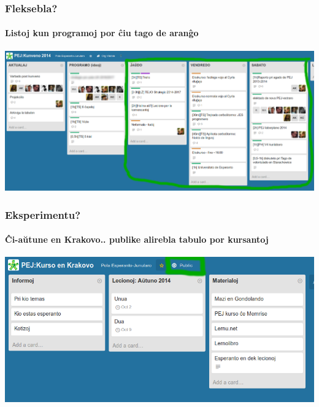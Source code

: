   \begin{frame}
    \frametitle{Fleksebla?}
    \framesubtitle{Listoj kun programoj por ĉiu tago de aranĝo}
    
    \includegraphics[scale=0.21]{ekranoj/programo-listoj}
  \end{frame}

  \begin{frame}
    \frametitle{Eksperimentu?}
    \framesubtitle{Ĉi-aŭtune en Krakovo.. publike alirebla tabulo por kursantoj}
    \begin{center}
    
    \includegraphics[scale=0.4]{ekranoj/e-kurso}
    \end{center}
  \end{frame}


